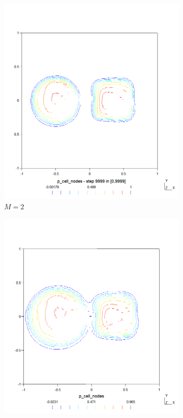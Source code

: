 \begin{figure}[p!]
\begin{subfigure}{.5\textwidth}
        \includegraphics[width=\linewidth]{../figs/sols/kriv-sol-h6400o02}
        \caption{$M=2$}
    \end{subfigure}
    \begin{subfigure}{.5\textwidth}
        \centering
        \includegraphics[width=\linewidth]{../figs/sols/kriv-sol-h3600o03}

\end{subfigure}
\end{figure}
